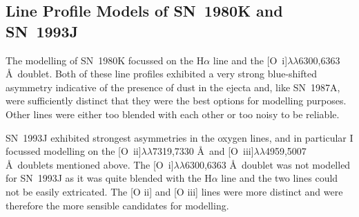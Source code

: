 \subsection{Line Profile Models of SN~1980K and SN~1993J}
\label{80K_93J_models}
The modelling of SN~1980K focussed on the H$\alpha$ line and the [O~{\sc i}]$\lambda\lambda$6300,6363 \AA\  doublet.  Both of these line profiles exhibited a very strong blue-shifted asymmetry indicative of the presence of dust in the ejecta and, like SN~1987A, were sufficiently distinct that they were the best options for modelling purposes.  Other lines were either too blended with each other or too noisy to be reliable.  

SN~1993J exhibited strongest asymmetries in the oxygen lines, and in particular I focussed modelling on the [O~{\sc ii}]$\lambda\lambda$7319,7330 \AA\  and [O~{\sc iii}]$\lambda\lambda$4959,5007 \AA\  doublets mentioned above.  The [O~{\sc i}]$\lambda\lambda$6300,6363 \AA\ doublet was not modelled for SN~1993J as it was quite blended with the H$\alpha$ line and the two lines could not be easily extricated.  The [O {\sc ii}] and [O {\sc iii}] lines were more distinct and were therefore the more sensible candidates for modelling.

